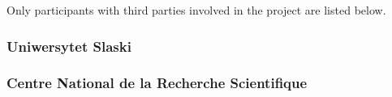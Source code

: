 Only participants with third parties involved in the project are listed below.

\subsubsection{Uniwersytet Slaski}

\subsubsection{Centre National de la Recherche Scientifique}






